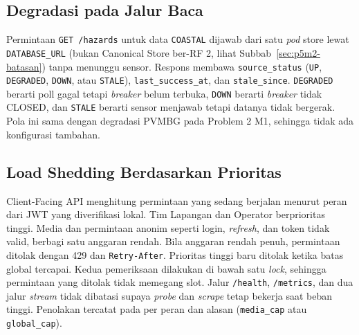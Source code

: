 \subsection{Degradasi pada Jalur Baca}

Permintaan \texttt{GET /hazards} untuk data \texttt{COASTAL} dijawab dari satu \textit{pod} store lewat \texttt{DATABASE\_URL} (bukan Canonical Store ber-RF 2, lihat Subbab~\ref{sec:p5m2-batasan}) tanpa menunggu sensor. Respons membawa \texttt{source\_status} (\texttt{UP}, \texttt{DEGRADED}, \texttt{DOWN}, atau \texttt{STALE}), \texttt{last\_success\_at}, dan \texttt{stale\_since}. \texttt{DEGRADED} berarti poll gagal tetapi \textit{breaker} belum terbuka, \texttt{DOWN} berarti \textit{breaker} tidak CLOSED, dan \texttt{STALE} berarti sensor menjawab tetapi datanya tidak bergerak. Pola ini sama dengan degradasi PVMBG pada Problem 2 M1, sehingga tidak ada konfigurasi tambahan.

\subsection{Load Shedding Berdasarkan Prioritas}

Client-Facing API menghitung permintaan yang sedang berjalan menurut peran dari JWT yang diverifikasi lokal. Tim Lapangan dan Operator berprioritas tinggi. Media dan permintaan anonim seperti login, \textit{refresh}, dan token tidak valid, berbagi satu anggaran rendah. Bila anggaran rendah penuh, permintaan ditolak dengan 429 dan \texttt{Retry-After}. Prioritas tinggi baru ditolak ketika batas global tercapai. Kedua pemeriksaan dilakukan di bawah satu \textit{lock}, sehingga permintaan yang ditolak tidak memegang slot. Jalur \texttt{/health}, \texttt{/metrics}, dan dua jalur \textit{stream} tidak dibatasi supaya \textit{probe} dan \textit{scrape} tetap bekerja saat beban tinggi. Penolakan tercatat pada  per peran dan alasan (\texttt{media\_cap} atau \texttt{global\_cap}).



